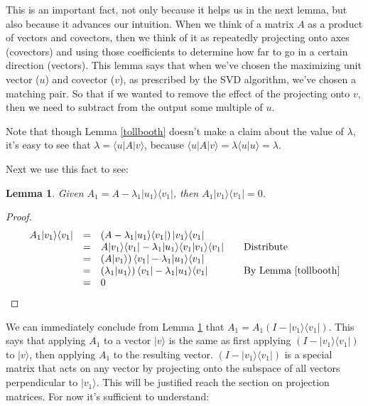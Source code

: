 \documentclass{amsbook}
\newtheorem{lemma}[theorem]{Lemma}
\begin{document}
This is an important fact, not only because it helps us in the next lemma, but also because it advances our intuition.  When we think of a matrix $A$ as a product of vectors and covectors, then we think of it as repeatedly projecting onto axes (covectors) and using those coefficients to determine how far to go in a certain direction (vectors).  This lemma says that when we've chosen the maximizing unit vector ($ u $) and covector ($ v $), as prescribed by the SVD algorithm, we've chosen a matching pair.  So that if we wanted to remove the effect of the projecting onto $ v $, then we need to subtract from the output some multiple of $ u $.

Note that though Lemma \ref{tollbooth} doesn't make a claim about the value of $\lambda$, it's easy to see that $\lambda=\langle u |A| v\rangle$, because $\langle u|A|v\rangle = \lambda\langle u|u\rangle = \lambda$.

Next we use this fact to see:

\begin{lemma}
\label{a1lemma}
Given $A_1=A-\lambda_1| u _1\rangle\langle v _1|$, then $A_1| v _1\rangle\langle v _1|=0$.
\end{lemma}

\begin{proof}
$$
\begin{array}{rcll}
A_1| v _1\rangle\langle v _1| &=& \left(A-\lambda_1| u _1\rangle\langle v _1|\right)| v _1\rangle\langle v _1|& \\
&=& A| v _1\rangle\langle v _1| - \lambda_1| u _1\rangle\langle v _1| v _1\rangle\langle v _1| & \quad\text{Distribute}\\
&=& \left(A| v _1\rangle\right)\langle v _1| - \lambda_1| u _1\rangle\langle v _1|& \\
&=& \left(\lambda_1| u _1\rangle\right)\langle v _1| - \lambda_1| u _1\rangle\langle v _1|&\quad\text{By Lemma \ref{tollbooth}} \\
&=& 0
\end{array}
$$
\end{proof}

We can immediately conclude from Lemma \ref{a1lemma} that $A_1=A_1\left(I-| v _1\rangle\langle v _1|\right)$.  This says that applying $A_1$ to a vector $| v \rangle$ is the same as first applying $\left(I-| v _1\rangle\langle v _1|\right)$ to $| v \rangle$, then applying $A_1$ to the resulting vector.  $\left(I-| v _1\rangle\langle v _1|\right)$ is a special matrix that acts on any vector by projecting onto the subspace of all vectors perpendicular to $| v _1\rangle$.  This will be justified reach the section on projection matrices.  For now it's sufficient to understand:
\end{document}
